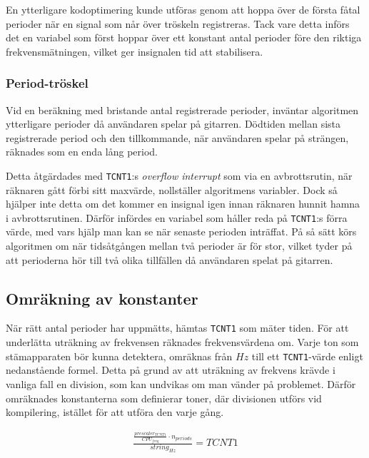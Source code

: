 \documentclass[a4paper]{article}
\begin{document}
En ytterligare kodoptimering kunde utföras genom att hoppa över de första fåtal perioder när en signal som når över tröskeln registreras. Tack vare detta införs det en variabel som först hoppar över ett konstant antal perioder före den riktiga frekvensmätningen, vilket ger insignalen tid att stabilisera.

\subsubsection{Period-tröskel}
\label{sec:periodtröskel}
Vid en beräkning med bristande antal registrerade perioder, inväntar algoritmen ytterligare perioder då användaren spelar på gitarren. Dödtiden mellan sista registrerade period och den tillkommande, när användaren spelar på strängen, räknades som en enda lång period.

Detta åtgärdades med \texttt{TCNT1}:s \textit{overflow interrupt} som via en avbrottsrutin, när räknaren gått förbi sitt maxvärde, nollställer algoritmens variabler.\cite[p.~114]{atmega16} Dock så hjälper inte detta om det kommer en insignal igen innan räknaren hunnit hamna i avbrottsrutinen. Därför infördes en variabel som håller reda på \texttt{TCNT1}:s förra värde, med vars hjälp man kan se när senaste perioden inträffat. På så sätt körs algoritmen om när tidsåtgången mellan två perioder är för stor, vilket tyder på att perioderna hör till två olika tillfällen då användaren spelat på gitarren.

\subsection{Omräkning av konstanter}

När rätt antal perioder har uppmätts, hämtas \texttt{TCNT1} som mäter tiden. För att underlätta uträkning av frekvensen räknades frekvensvärdena om. Varje ton som stämapparaten bör kunna detektera\cite{tunings}, omräknas från $Hz$ till ett \texttt{TCNT1}-värde enligt nedanstående formel. Detta på grund av att uträkning av frekvens krävde i vanliga fall en division, som kan undvikas om man vänder på problemet. Därför omräknades konstanterna som definierar toner, där divisionen utförs vid kompilering, istället för att utföra den varje gång.

\begin{eqnarray}
\label{eq:timer}
\frac{\frac{ prescaler_{TCNT1} }{ CPU_{freq} } \cdot n_{periods} }{ string_{Hz} } = TCNT1
\end{eqnarray}
\end{document}
